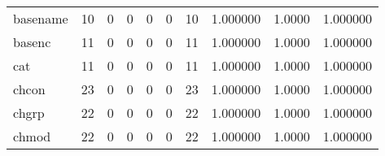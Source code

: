 \begin{tabular}{lrrrrrrrrr}
basename  &                                       10 &                                                  0 &                                                  0 &                                                  0 &                                                  0 &                                                 10 &                                           1.000000 &                                 1.0000 &                             1.000000 \\
basenc    &                                       11 &                                                  0 &                                                  0 &                                                  0 &                                                  0 &                                                 11 &                                           1.000000 &                                 1.0000 &                             1.000000 \\
cat       &                                       11 &                                                  0 &                                                  0 &                                                  0 &                                                  0 &                                                 11 &                                           1.000000 &                                 1.0000 &                             1.000000 \\
chcon     &                                       23 &                                                  0 &                                                  0 &                                                  0 &                                                  0 &                                                 23 &                                           1.000000 &                                 1.0000 &                             1.000000 \\
chgrp     &                                       22 &                                                  0 &                                                  0 &                                                  0 &                                                  0 &                                                 22 &                                           1.000000 &                                 1.0000 &                             1.000000 \\
chmod     &                                       22 &                                                  0 &                                                  0 &                                                  0 &                                                  0 &                                                 22 &                                           1.000000 &                                 1.0000 &                             1.000000 \\

\end{tabular}
